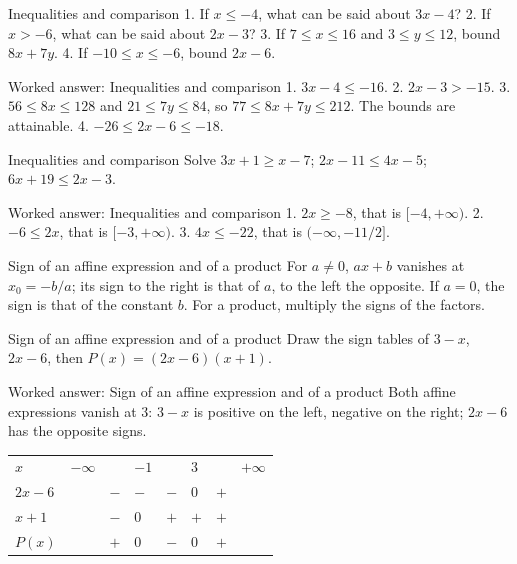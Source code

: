 \documentclass[aspectratio=169,10pt]{beamer}
\begin{document}
\begin{frame}{Inequalities and comparison}
1. If \(x\leq-4\), what can be said about \(3x-4\)? 2. If \(x>-6\), what can be said about \(2x-3\)? 3. If \(7\leq x\leq16\) and \(3\leq y\leq12\), bound \(8x+7y\). 4. If \(-10\leq x\leq-6\), bound \(2x-6\).
\end{frame}
\begin{frame}{Worked answer: Inequalities and comparison}
1. \(3x-4\leq-16\). 2. \(2x-3>-15\). 3. \(56\leq8x\leq128\) and \(21\leq7y\leq84\), so \(77\leq8x+7y\leq212\). The bounds are attainable. 4. \(-26\leq2x-6\leq-18\).
\end{frame}
\begin{frame}{Inequalities and comparison}
Solve \(3x+1\geq x-7\); \(2x-11\leq4x-5\); \(6x+19\leq2x-3\).
\end{frame}
\begin{frame}{Worked answer: Inequalities and comparison}
1. \(2x\geq-8\), that is \([-4,+\infty)\). 2. \(-6\leq2x\), that is \([-3,+\infty)\). 3. \(4x\leq-22\), that is \((-\infty,-11/2]\).
\end{frame}
\begin{frame}{Sign of an affine expression and of a product}
For \(a\ne0\), \(ax+b\) vanishes at \(x_0=-b/a\); its sign to the right is that of \(a\), to the left the opposite. If \(a=0\), the sign is that of the constant \(b\). For a product, multiply the signs of the factors.
\end{frame}
\begin{frame}{Sign of an affine expression and of a product}
Draw the sign tables of \(3-x\), \(2x-6\), then \(P(x)=(2x-6)(x+1)\).
\end{frame}
\begin{frame}{Worked answer: Sign of an affine expression and of a product}
Both affine expressions vanish at \(3\): \(3-x\) is positive on the left, negative on the right; \(2x-6\) has the opposite signs.
  \begin{center}\begin{tabular}{llllllll}
\(x\) & \(-\infty\) &  & \(-1\) &  & \(3\) &  & \(+\infty\) \\ 
\(2x-6\) &  & \(-\) & \(-\) & \(-\) & \(0\) & \(+\) &  \\ 
\(x+1\) &  & \(-\) & \(0\) & \(+\) & \(+\) & \(+\) &  \\ 
\(P(x)\) &  & \(+\) & \(0\) & \(-\) & \(0\) & \(+\) &  \\ 
\end{tabular}\end{center}
\end{frame}
\end{document}
